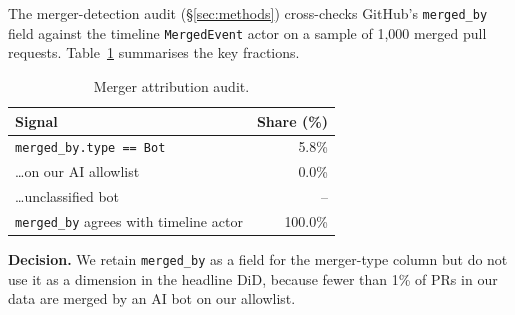 
The merger-detection audit (§\ref{sec:methods}) cross-checks GitHub's \texttt{merged\_by} field against the timeline \texttt{MergedEvent} actor on a sample of 1,000{} merged pull requests. Table~\ref{tab:audit} summarises the key fractions.

\begin{table}[h]
\centering\footnotesize
\caption{Merger attribution audit.}
\label{tab:audit}
\begin{tabular}{@{}lr@{}}
\toprule
Signal & Share (\%) \\
\midrule
\texttt{merged\_by.type == Bot} & 5.8\% \\
\phantom{xx}\ldots on our AI allowlist & 0.0\% \\
\phantom{xx}\ldots unclassified bot & -- \\
\texttt{merged\_by} agrees with timeline actor & 100.0\% \\
\bottomrule
\end{tabular}
\end{table}

\textbf{Decision.} We retain \texttt{merged\_by} as a field for the merger-type column but do not use it as a dimension in the headline DiD, because fewer than 1\% of PRs in our data are merged by an AI bot on our allowlist.{}
